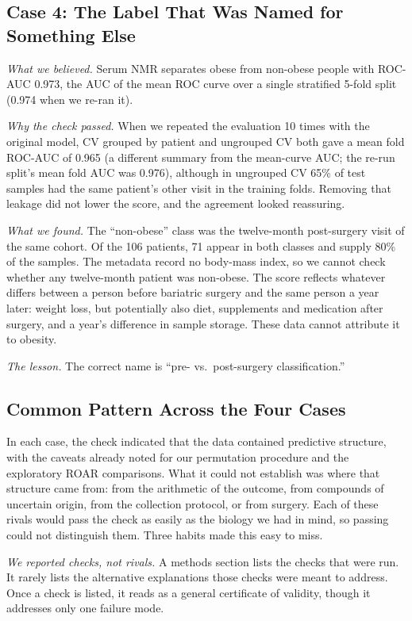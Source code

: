 \documentclass[conference]{IEEEtran}
\begin{document}
\subsection{Case 4: The Label That Was Named for Something Else}
\label{sec:case4}

\emph{What we believed.} Serum NMR separates obese from non-obese people with
ROC-AUC 0.973, the AUC of the mean ROC curve over a single stratified 5-fold
split (0.974 when we re-ran it).

\emph{Why the check passed.} When we repeated the evaluation 10 times with
the original model, CV grouped by patient and ungrouped CV both gave a mean
fold ROC-AUC of 0.965 (a different summary from the mean-curve AUC; the
re-run split's mean fold AUC was 0.976), although in ungrouped CV 65\% of
test samples had the same patient's other visit in the training folds.
Removing that leakage did not lower the score, and the agreement looked
reassuring.

\emph{What we found.} The ``non-obese'' class was the twelve-month
post-surgery visit of the same cohort. Of the 106 patients, 71 appear in both
classes and supply 80\% of the samples. The metadata record no body-mass
index, so we cannot check whether any twelve-month patient was non-obese.
The score reflects whatever differs between a person before bariatric
surgery and the same person a year later: weight loss, but potentially also
diet, supplements and medication after surgery, and a year's difference in
sample storage. These data cannot attribute it to obesity.

\emph{The lesson.} The correct name is ``pre- vs.\ post-surgery
classification.''

\subsection{Common Pattern Across the Four Cases}
In each case, the check indicated that the data contained predictive
structure, with the caveats already noted for our permutation procedure and
the exploratory ROAR comparisons. What it could not establish was where that
structure came from: from the arithmetic of the outcome, from compounds of
uncertain origin, from the collection protocol, or from surgery. Each of
these rivals would pass the check as easily as the biology we had in mind,
so passing could not distinguish them. Three habits made this easy to miss.

\emph{We reported checks, not rivals.} A methods section lists the checks
that were run. It rarely lists the alternative explanations those checks
were meant to address. Once a check is listed, it reads as a general
certificate of validity, though it addresses only one failure mode.
\end{document}
